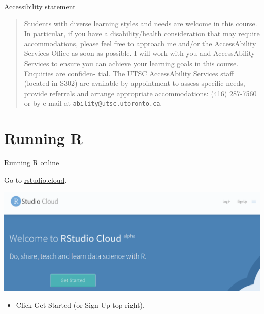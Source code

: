 \documentclass[
  ignorenonframetext,
]{beamer}
\providecommand{\tightlist}{%
  \setlength{\itemsep}{0pt}\setlength{\parskip}{0pt}}
\begin{document}
\begin{frame}[fragile]{Accessibility statement}
\protect\hypertarget{accessibility-statement}{}

\begin{quote}
Students with diverse learning styles and needs are welcome in this
course. In particular, if you have a disability/health consideration
that may require accommodations, please feel free to approach me and/or
the AccessAbility Services Office as soon as possible. I will work with
you and AccessAbility Services to ensure you can achieve your learning
goals in this course. Enquiries are confiden- tial. The UTSC
AccessAbility Services staff (located in S302) are available by
appointment to assess specific needs, provide referrals and arrange
appropriate accommodations: (416) 287-7560 or by e-mail at
\texttt{ability@utsc.utoronto.ca}.
\end{quote}

\end{frame}

\hypertarget{running-r}{%
\section{Running R}\label{running-r}}

\begin{frame}{Running R online}
\protect\hypertarget{running-r-online}{}

Go to \href{https://rstudio.cloud}{rstudio.cloud}.

\includegraphics{Screenshot_2018-06-29_15-01-16.png}

\begin{itemize}
\tightlist
\item
  Click Get Started (or Sign Up top right).
\end{itemize}

\end{frame}
\end{document}
